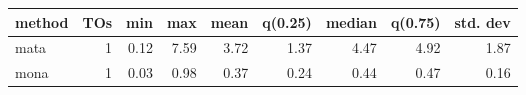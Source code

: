 \begin{tabular}{lrrrrrrrr}
\hline
 method   &   TOs &   min &   max &   mean &   q(0.25) &   median &   q(0.75) &   std. dev \\
\hline
 mata     &  1 &  0.12 &  7.59 &   3.72 &      1.37 &     4.47 &      4.92 &       1.87 \\
 mona     &  1 &  0.03 &  0.98 &   0.37 &      0.24 &     0.44 &      0.47 &       0.16 \\
\hline
\end{tabular}
